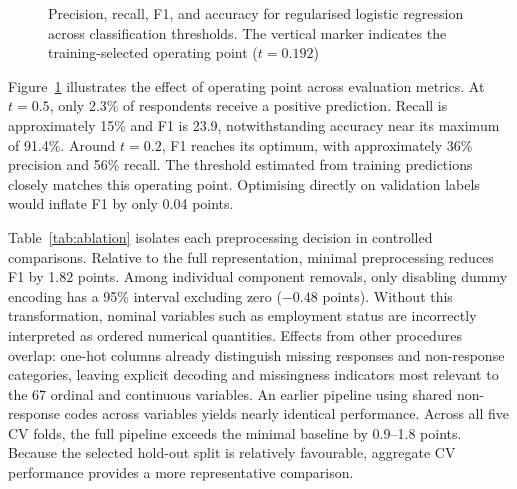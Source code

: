 \documentclass[10pt,conference]{IEEEtran}
\begin{document}
\begin{figure}[tbp]
\caption{Precision, recall, F1, and accuracy for regularised
logistic regression across classification thresholds. The vertical
marker indicates the training-selected operating point ($t=0.192$)}
\label{fig:threshold}
\end{figure}

Figure~\ref{fig:threshold} illustrates the effect of operating point across evaluation metrics.
At $t=0.5$, only 2.3\% of respondents receive a positive prediction.
Recall is approximately 15\% and F1 is 23.9, notwithstanding accuracy
near its maximum of 91.4\%. Around $t=0.2$, F1 reaches its optimum,
with approximately 36\% precision and 56\% recall. The threshold
estimated from training predictions closely matches this operating
point. Optimising directly on validation labels would inflate F1 by
only 0.04 points.



Table~\ref{tab:ablation} isolates each preprocessing decision in controlled comparisons. Relative
to the full representation, minimal preprocessing reduces F1 by
1.82 points. Among individual component removals, only disabling dummy
encoding has a 95\% interval excluding zero ($-0.48$ points). Without
this transformation, nominal variables such as employment status are
incorrectly interpreted as ordered numerical quantities. Effects from
other procedures overlap: one-hot columns already distinguish missing
responses and non-response categories, leaving explicit decoding and
missingness indicators most relevant to the 67 ordinal and continuous
variables. An earlier pipeline using shared non-response codes across
variables yields nearly identical performance. Across all five CV folds,
the full pipeline exceeds the minimal baseline by 0.9--1.8 points.
Because the selected hold-out split is relatively favourable, aggregate
CV performance provides a more representative comparison. 
\end{document}
